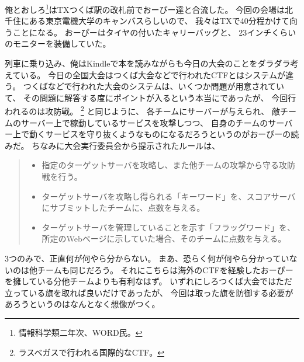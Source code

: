 俺とおしろ\footnote{情報科学類二年次、WORD民。}はTXつくば駅の改札前でおーぴー達と合流した。
今回の会場は北千住にある東京電機大学のキャンバスらしいので、
我々はTXで40分程かけて向うことになる。
おーぴーはタイヤの付いたキャリーバッグと、
23インチくらいのモニターを装備していた。

列車に乗り込み、俺はKindleで本を読みながらも今日の大会のことをダラダラ考えている。
今日の全国大会はつくば大会などで行われたCTFとはシステムが違う。
つくばなどで行われた大会のシステムは、いくつか問題が用意されていて、
その問題に解答する度にポイントが入るという本当にであったが、
今回行われるのは攻防戦。
\DEFCON\footnote{ラスベガスで行われる国際的なCTF。}%
と同じように、
各チームにサーバーが与えられ、
敵チームのサーバー上で稼動しているサービスを攻撃しつつ、
自身のチームのサーバー上で動くサービスを守り抜くようなものになるだろうというのがおーぴーの読みだ。
ちなみに大会実行委員会から提示されたルールは、

\begin{quote}
	\begin{itemize}
		\item 指定のターゲットサーバを攻略し、また他チームの攻撃から守る攻防戦を行う。
		\item ターゲットサーバを攻略し得られる「キーワード」を、スコアサーバにサブミットしたチームに、点数を与える。
		\item ターゲットサーバを管理していることを示す「フラッグワード」を、所定のWebページに示していた場合、そのチームに点数を与える。
	\end{itemize}
\end{quote}

3つのみで、正直何が何やら分からない。
まあ、恐らく何が何やら分かっていないのは他チームも同じだろう。
それにこちらは海外のCTFを経験したおーぴーを擁している分他チームよりも有利なはず。
いずれにしろつくば大会ではただ立っている旗を取れば良いだけであったが、
今回は取った旗を防御する必要があろうというのはなんとなく想像がつく。


